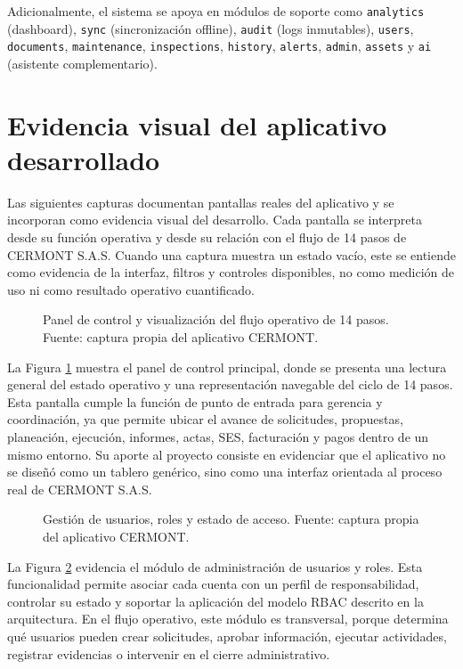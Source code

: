 Adicionalmente, el sistema se apoya en módulos de soporte como \texttt{analytics} (dashboard), \texttt{sync} (sincronización offline), \texttt{audit} (logs inmutables), \texttt{users}, \texttt{documents}, \texttt{maintenance}, \texttt{inspections}, \texttt{history}, \texttt{alerts}, \texttt{admin}, \texttt{assets} y \texttt{ai} (asistente complementario).

\section{Evidencia visual del aplicativo desarrollado}
\label{sec:evidencia-visual-aplicativo}

Las siguientes capturas documentan pantallas reales del aplicativo y se incorporan como evidencia visual del desarrollo. Cada pantalla se interpreta desde su función operativa y desde su relación con el flujo de 14 pasos de CERMONT S.A.S. Cuando una captura muestra un estado vacío, este se entiende como evidencia de la interfaz, filtros y controles disponibles, no como medición de uso ni como resultado operativo cuantificado.

\begin{figure}[H]
\centering
{}
\caption{Panel de control y visualización del flujo operativo de 14 pasos. Fuente: captura propia del aplicativo CERMONT.}
\label{fig:captura-dashboard-14-pasos}
\end{figure}

La Figura \ref{fig:captura-dashboard-14-pasos} muestra el panel de control principal, donde se presenta una lectura general del estado operativo y una representación navegable del ciclo de 14 pasos. Esta pantalla cumple la función de punto de entrada para gerencia y coordinación, ya que permite ubicar el avance de solicitudes, propuestas, planeación, ejecución, informes, actas, SES, facturación y pagos dentro de un mismo entorno. Su aporte al proyecto consiste en evidenciar que el aplicativo no se diseñó como un tablero genérico, sino como una interfaz orientada al proceso real de CERMONT S.A.S.

\begin{figure}[H]
\centering
{}
\caption{Gestión de usuarios, roles y estado de acceso. Fuente: captura propia del aplicativo CERMONT.}
\label{fig:captura-usuarios-roles}
\end{figure}

La Figura \ref{fig:captura-usuarios-roles} evidencia el módulo de administración de usuarios y roles. Esta funcionalidad permite asociar cada cuenta con un perfil de responsabilidad, controlar su estado y soportar la aplicación del modelo RBAC descrito en la arquitectura. En el flujo operativo, este módulo es transversal, porque determina qué usuarios pueden crear solicitudes, aprobar información, ejecutar actividades, registrar evidencias o intervenir en el cierre administrativo.

